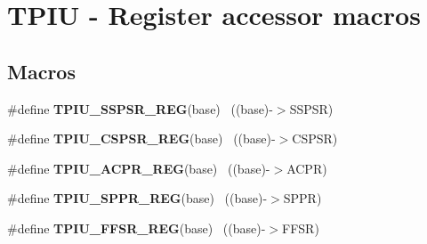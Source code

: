 \hypertarget{group___t_p_i_u___register___accessor___macros}{}\section{T\+P\+I\+U -\/ Register accessor macros}
\label{group___t_p_i_u___register___accessor___macros}
\subsection*{Macros}
\begin{DoxyCompactItemize}
\item 
\hypertarget{group___t_p_i_u___register___accessor___macros_ga70f7b58922eb91eec6196998a950e7e6}{}\#define {\bfseries T\+P\+I\+U\+\_\+\+S\+S\+P\+S\+R\+\_\+\+R\+E\+G}(base)                                      ~((base)-\/$>$S\+S\+P\+S\+R)\label{group___t_p_i_u___register___accessor___macros_ga70f7b58922eb91eec6196998a950e7e6}

\item 
\hypertarget{group___t_p_i_u___register___accessor___macros_gafea47d54b3ce624f0b487095a33f87ee}{}\#define {\bfseries T\+P\+I\+U\+\_\+\+C\+S\+P\+S\+R\+\_\+\+R\+E\+G}(base)                                      ~((base)-\/$>$C\+S\+P\+S\+R)\label{group___t_p_i_u___register___accessor___macros_gafea47d54b3ce624f0b487095a33f87ee}

\item 
\hypertarget{group___t_p_i_u___register___accessor___macros_gaa1533cc1963e2e41268410ac18591036}{}\#define {\bfseries T\+P\+I\+U\+\_\+\+A\+C\+P\+R\+\_\+\+R\+E\+G}(base)                                        ~((base)-\/$>$A\+C\+P\+R)\label{group___t_p_i_u___register___accessor___macros_gaa1533cc1963e2e41268410ac18591036}

\item 
\hypertarget{group___t_p_i_u___register___accessor___macros_ga0999ff94c91a95cc02e2bbd25f41f2b4}{}\#define {\bfseries T\+P\+I\+U\+\_\+\+S\+P\+P\+R\+\_\+\+R\+E\+G}(base)                                        ~((base)-\/$>$S\+P\+P\+R)\label{group___t_p_i_u___register___accessor___macros_ga0999ff94c91a95cc02e2bbd25f41f2b4}

\item 
\hypertarget{group___t_p_i_u___register___accessor___macros_ga87fa1043a4397fabb81e4be255c0a6d2}{}\#define {\bfseries T\+P\+I\+U\+\_\+\+F\+F\+S\+R\+\_\+\+R\+E\+G}(base)                                        ~((base)-\/$>$F\+F\+S\+R)\label{group___t_p_i_u___register___accessor___macros_ga87fa1043a4397fabb81e4be255c0a6d2}


\end{DoxyCompactItemize}
